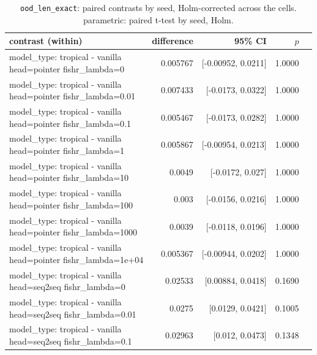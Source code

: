 \documentclass[10pt]{article}
\makeatletter
\newcommand{\stackcell}[1]{\begin{tabular}[t]{@{}l@{}}#1\end{tabular}}
\makeatother
\begin{document}
{\small
\begin{longtable}{lrrrl}
\caption{\texttt{ood\_len\_exact}: paired contrasts by seed, Holm-corrected across the cells. parametric: paired t-test by seed, Holm.}\label{tab:paired-ood_len_exact}\\
\toprule
contrast (within) & difference & 95\% CI & $p$ & \\
\midrule
\endhead
\stackcell{model\_type: tropical - vanilla\\\footnotesize head=pointer fishr\_lambda=0 } & 0.005767 & [-0.00952, 0.0211] & 1.0000 & \\
\stackcell{model\_type: tropical - vanilla\\\footnotesize head=pointer fishr\_lambda=0.01 } & 0.007433 & [-0.0173, 0.0322] & 1.0000 & \\
\stackcell{model\_type: tropical - vanilla\\\footnotesize head=pointer fishr\_lambda=0.1 } & 0.005467 & [-0.0173, 0.0282] & 1.0000 & \\
\stackcell{model\_type: tropical - vanilla\\\footnotesize head=pointer fishr\_lambda=1 } & 0.005867 & [-0.00954, 0.0213] & 1.0000 & \\
\stackcell{model\_type: tropical - vanilla\\\footnotesize head=pointer fishr\_lambda=10 } & 0.0049 & [-0.0172, 0.027] & 1.0000 & \\
\stackcell{model\_type: tropical - vanilla\\\footnotesize head=pointer fishr\_lambda=100 } & 0.003 & [-0.0156, 0.0216] & 1.0000 & \\
\stackcell{model\_type: tropical - vanilla\\\footnotesize head=pointer fishr\_lambda=1000 } & 0.0039 & [-0.0118, 0.0196] & 1.0000 & \\
\stackcell{model\_type: tropical - vanilla\\\footnotesize head=pointer fishr\_lambda=1e+04 } & 0.005367 & [-0.00944, 0.0202] & 1.0000 & \\
\stackcell{model\_type: tropical - vanilla\\\footnotesize head=seq2seq fishr\_lambda=0 } & 0.02533 & [0.00884, 0.0418] & 0.1690 & \\
\stackcell{model\_type: tropical - vanilla\\\footnotesize head=seq2seq fishr\_lambda=0.01 } & 0.0275 & [0.0129, 0.0421] & 0.1005 & \\
\stackcell{model\_type: tropical - vanilla\\\footnotesize head=seq2seq fishr\_lambda=0.1 } & 0.02963 & [0.012, 0.0473] & 0.1348 & \\

\end{longtable}}
\end{document}
